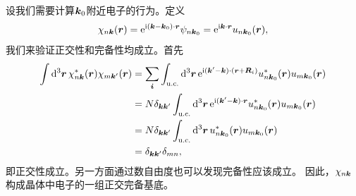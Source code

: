 设我们需要计算$\vb*{k}_0$附近电子的行为。定义
\begin{equation}
    \chi_{n \vb*{k}}(\vb*{r}) = \mathrm{e}^{\mathrm{i} (\vb*{k} - \vb*{k}_0) \cdot \vb*{r}} \psi_{n \vb*{k}_0} = \mathrm{e}^{\mathrm{i} \vb*{k} \cdot \vb*{r}} u_{n \vb*{k}_0} (\vb*{r}),
\end{equation}
我们来验证正交性和完备性均成立。首先
\[
    \begin{aligned}
        \int \dd[3]{\vb*{r}} \chi^*_{n \vb*{k}}(\vb*{r}) \chi_{m \vb*{k}'}(\vb*{r}) &= \sum_{\vb*{i}} \int_\text{u.c.} \dd[3]{\vb*{r}} \mathrm{e}^{\mathrm{i} (\vb*{k}' - \vb*{k}) \cdot (\vb*{r} + \vb*{R}_i)} u^*_{n \vb*{k}_0}(\vb*{r}) u_{m \vb*{k}_0}(\vb*{r}) \\
        &= N \delta_{\vb*{k} \vb*{k}'} \int_\text{u.c.} \dd[3]{\vb*{r}} \mathrm{e}^{\mathrm{i} (\vb*{k}' - \vb*{k}) \cdot \vb*{r}} u^*_{n \vb*{k}_0}(\vb*{r}) u_{m \vb*{k}_0}(\vb*{r}) \\
        &= N \delta_{\vb*{k} \vb*{k}'} \int_\text{u.c.} \dd[3]{\vb*{r}} u^*_{n \vb*{k}_0}(\vb*{r}) u_{m \vb*{k}_0}(\vb*{r}) \\
        &= \delta_{\vb*{k} \vb*{k}'} \delta_{mn},
    \end{aligned}
\]
即正交性成立。另一方面通过数自由度也可以发现完备性应该成立。
因此，$\chi_{n \vb*{k}}$构成晶体中电子的一组正交完备基底。

